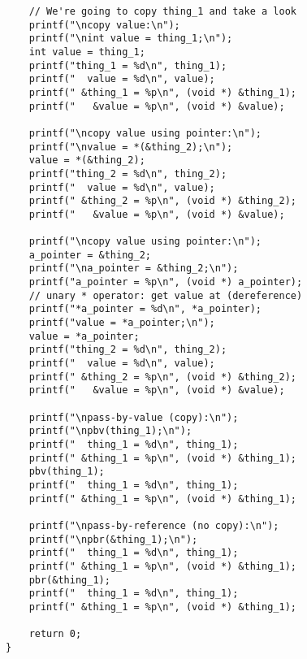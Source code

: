 \documentclass[11pt]{article}
\begin{document}
\begin{verbatim}
    // We're going to copy thing_1 and take a look
    printf("\ncopy value:\n");
    printf("\nint value = thing_1;\n");
    int value = thing_1;
    printf("thing_1 = %d\n", thing_1);
    printf("  value = %d\n", value);
    printf(" &thing_1 = %p\n", (void *) &thing_1);
    printf("   &value = %p\n", (void *) &value);

    printf("\ncopy value using pointer:\n");
    printf("\nvalue = *(&thing_2);\n");
    value = *(&thing_2);
    printf("thing_2 = %d\n", thing_2);
    printf("  value = %d\n", value);
    printf(" &thing_2 = %p\n", (void *) &thing_2);
    printf("   &value = %p\n", (void *) &value);

    printf("\ncopy value using pointer:\n");
    a_pointer = &thing_2;
    printf("\na_pointer = &thing_2;\n");
    printf("a_pointer = %p\n", (void *) a_pointer);
    // unary * operator: get value at (dereference)
    printf("*a_pointer = %d\n", *a_pointer);
    printf("value = *a_pointer;\n");
    value = *a_pointer;
    printf("thing_2 = %d\n", thing_2);
    printf("  value = %d\n", value);
    printf(" &thing_2 = %p\n", (void *) &thing_2);
    printf("   &value = %p\n", (void *) &value);

    printf("\npass-by-value (copy):\n");
    printf("\npbv(thing_1);\n");
    printf("  thing_1 = %d\n", thing_1);
    printf(" &thing_1 = %p\n", (void *) &thing_1);
    pbv(thing_1);
    printf("  thing_1 = %d\n", thing_1);
    printf(" &thing_1 = %p\n", (void *) &thing_1);

    printf("\npass-by-reference (no copy):\n");
    printf("\npbr(&thing_1);\n");
    printf("  thing_1 = %d\n", thing_1);
    printf(" &thing_1 = %p\n", (void *) &thing_1);
    pbr(&thing_1);
    printf("  thing_1 = %d\n", thing_1);
    printf(" &thing_1 = %p\n", (void *) &thing_1);

    return 0;
}
\end{verbatim}
\end{document}
